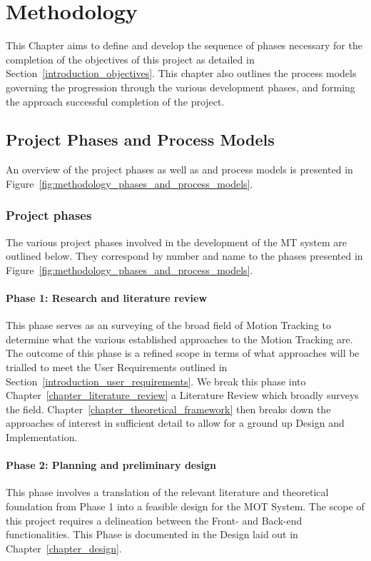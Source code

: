 \chapter{Methodology}\label{methodology}
This Chapter aims to define and develop the sequence of phases necessary for the completion
of the objectives of this project as detailed in
Section~\ref{introduction_objectives}. This chapter also outlines the process
models governing the progression through the various development phases, and
forming the approach successful completion of the project.

\section{Project Phases and Process Models }
An overview of the project phases as well as and process models is presented in
Figure~\ref{fig:methodology_phases_and_process_models}.

\subsection{Project phases}
The various project phases involved in the development of the MT system are
outlined below. They correspond by number and name to the phases presented in
Figure~\ref{fig:methodology_phases_and_process_models}.

\subsubsection{Phase 1: Research and literature review}
This phase serves as an surveying of the broad field of Motion Tracking to
determine what the various established approaches to the Motion Tracking are.
The outcome of this phase is a refined scope in terms of what approaches will be
trialled to meet the User Requirements outlined in
Section~\ref{introduction_user_requirements}. We break this phase into
Chapter~\ref{chapter_literature_review} a Literature Review which broadly
surveys the field. Chapter~\ref{chapter_theoretical_framework} then breaks down
the approaches of interest in sufficient detail to allow for a ground up Design
and Implementation.

\subsubsection{Phase 2: Planning and preliminary design}
This phase involves a translation of the relevant literature and theoretical
foundation from Phase 1 into a feasible design for the MOT System. The scope of
this project requires a delineation between the Front- and Back-end
functionalities. This Phase is documented in the Design laid out in
Chapter~\ref{chapter_design}.

